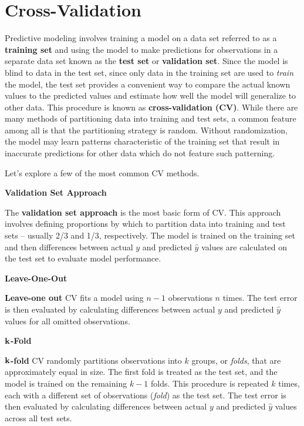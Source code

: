 \documentclass[
]{book}
\begin{document}
\hypertarget{cross-validation}{%
\section{Cross-Validation}\label{cross-validation}}

Predictive modeling involves training a model on a data set referred to as a \textbf{training set} and using the model to make predictions for observations in a separate data set known as the \textbf{test set} or \textbf{validation set}. Since the model is blind to data in the test set, since only data in the training set are used to \emph{train} the model, the test set provides a convenient way to compare the actual known values to the predicted values and estimate how well the model will generalize to other data. This procedure is known as \textbf{cross-validation (CV)}. While there are many methods of partitioning data into training and test sets, a common feature among all is that the partitioning strategy is random. Without randomization, the model may learn patterns characteristic of the training set that result in inaccurate predictions for other data which do not feature such patterning.

Let's explore a few of the most common CV methods.

\textbf{Validation Set Approach}

The \textbf{validation set approach} is the most basic form of CV. This approach involves defining proportions by which to partition data into training and test sets -- usually 2/3 and 1/3, respectively. The model is trained on the training set and then differences between actual \(y\) and predicted \(\hat y\) values are calculated on the test set to evaluate model performance.

\textbf{Leave-One-Out}

\textbf{Leave-one out} CV fits a model using \(n-1\) observations \(n\) times. The test error is then evaluated by calculating differences between actual \(y\) and predicted \(\hat y\) values for all omitted observations.

\(\textbf k\)\textbf{-Fold}

\(\textbf k\)\textbf{-fold} CV randomly partitions observations into \(k\) groups, or \emph{folds}, that are approximately equal in size. The first fold is treated as the test set, and the model is trained on the remaining \(k-1\) folds. This procedure is repeated \(k\) times, each with a different set of observations (\emph{fold}) as the test set. The test error is then evaluated by calculating differences between actual \(y\) and predicted \(\hat y\) values across all test sets.
\end{document}

